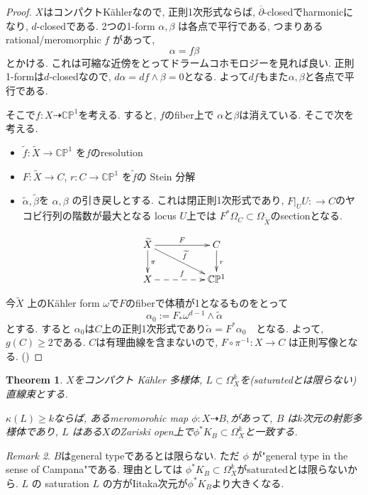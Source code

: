 \documentclass[dvipdfmx,a4paper,11pt]{article} %
\newtheorem{thm}{Theorem}[section]
\theoremstyle{definition}
\theoremstyle{remark}
\newtheorem{rem}[thm]{Remark}
\numberwithin{equation}{section}
\newcommand{\C}{\mathbb{C}}
\begin{document}
\begin{proof}
$X$はコンパクトK\"ahlerなので, 正則1次形式ならば, $\overline{\partial}$-closedでharmonicになり, $d$-closedである.
2つの1-form
\(\alpha, \beta\) は各点で平行である, つまりある
rational/meromorphic \(f\) があって, 
 \[\alpha = f\beta\]
 とかける.
 これは可縮な近傍をとってドラームコホモロジーを見れば良い. 
正則 1-formは$d$-closedなので, \(d\alpha=df \wedge \beta = 0\)となる. 
よって\(df\)もまた\(\alpha, \beta\)と各点で平行である.

 そこで\(f : X \dashrightarrow \C\mathbb{P}^1\)を考える. %
 すると, $f$のfiber上で \(\alpha\)と\(\beta\)は消えている. 
 そこで次を考える.
 \begin{itemize}
 \item \(\tilde{f} : \tilde{X} \to \C\mathbb{P}^1\) を$f$のresolution
 \item \(F : \tilde{X} \to C\),  \(r : C \to \C\mathbb{P}^1\) を$\widetilde{f}$の Stein 分解
 \item   \(\tilde{\alpha}, \tilde{\beta}\)を \(\alpha, \beta\) の引き戻しとする. これは閉正則1次形式であり, \(F|_{U} U : \to C\)のヤコビ行列の階数が最大となる locus $U$上では
 \(F^*\Omega_C \subset \Omega_{\tilde{X}}\)のsectionとなる. 
 \end{itemize}
 \[
\xymatrix@C=50pt@R=20pt{
\widetilde{X}\ar@{->}[rd]^{\widetilde{f}}\ar@{->}[r]^{F} \ar@{->}[d]^{\pi} & C \ar[d]^{r} \\
X\ar@{-->}[r]^{f}& \C\mathbb{P}^1
}
\]

今\(\tilde{X}\) 上のK\"ahler form $\omega$で$F$のfiberで体積が1となるものをとって
$$
\alpha_0 := F_*\omega^{d-1}\wedge \tilde{\alpha}
$$
とする.
すると $\alpha_0$は$C$上の正則1次形式であり\(\tilde{\alpha} = F^*\alpha_0\)　となる.
よって, \(g(C) \ge 2\)である. $C$は有理曲線を含まないので, 
\(F \circ \pi^{-1}: X \to C\) は正則写像となる. (\cite[1.1節参照]{KM98})
\end{proof}
\begin{thm}\cite[Theorem 1.13. Bogomolov and Campana]{Voi}
 \label{thm-Voi-1.13}
\(X\)をコンパクト Kähler 多様体,  \(L \subset \Omega_X^k\)を(saturatedとは限らない)直線束とする.

\(\kappa(L) \ge k\)ならば, あるmeromorohic map \(\phi : X \dashrightarrow B,\)があって, 
 \(B\) は$k$次元の射影多様体であり, 
\(L\) はある$X$のZariski open上で\(\phi^*K_B \subset \Omega_X^k\)と一致する. 
\end{thm}

\begin{rem}\cite[Remark 1.14]{Voi}
 \(B\)はgeneral typeであるとは限らない. 
ただ \(\phi\) が"general type in the sense of Campana"である. 
理由としては
 \(\phi^*K_B \subset \Omega_X^k\)がsaturatedとは限らないから. 
 $L$ の saturation \(L\) の方がIitaka次元が\(\phi^*K_B\)より大きくなる. 
\end{rem}
\end{document}
